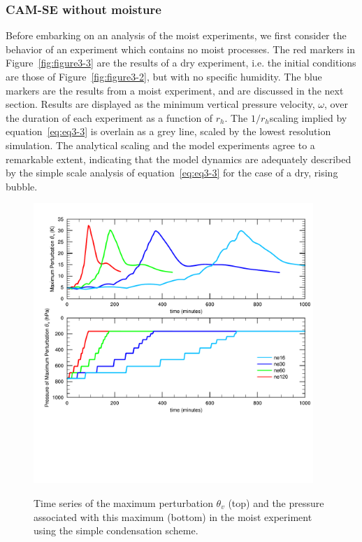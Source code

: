 \subsubsection{CAM-SE without moisture}
Before embarking on an analysis of the moist experiments, we first consider the behavior of an experiment which contains no moist processes. The red markers in Figure~\ref{fig:figure3-3} are the results of a dry experiment, i.e. the initial conditions are those of Figure~\ref{fig:figure3-2}, but with no specific humidity. The blue markers are the results from a moist experiment, and are discussed in the next section. Results are displayed as the minimum vertical pressure velocity, $\omega$, over the duration of each experiment as a function of $r_h$. The $1/r_h$scaling implied by equation~\ref{eq:eq3-3} is overlain as a grey line, scaled by the lowest resolution simulation. The analytical scaling and the model experiments agree to a remarkable extent, indicating that the model dynamics are adequately described by the simple scale analysis of equation~\ref{eq:eq3-3} for the case of a dry, rising bubble.

\begin{figure}
\begin{center}
\noindent\includegraphics[width=25pc,angle=0]{chapter3/Figure4_crop.pdf}\\
\end{center}
\caption{Time series of the maximum perturbation $\theta_v$ (top) and the pressure associated with this maximum (bottom) in the moist experiment using the simple condensation scheme.}
\label{fig:figure3-4}
\end{figure}

